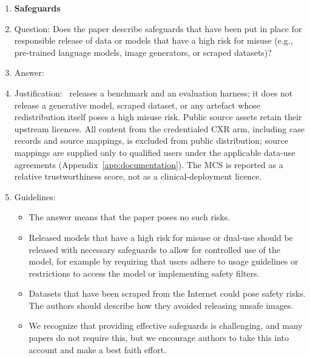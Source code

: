 \begin{enumerate}
\begin{itemize}
        \item If there are negative societal impacts, the authors could also discuss possible mitigation strategies (e.g., gated release of models, providing defenses in addition to attacks, mechanisms for monitoring misuse, mechanisms to monitor how a system learns from feedback over time, improving the efficiency and accessibility of ML).
    \end{itemize}

\item {\bf Safeguards}
    \item[] Question: Does the paper describe safeguards that have been put in place for responsible release of data or models that have a high risk for misuse (e.g., pre-trained language models, image generators, or scraped datasets)?
    \item[] Answer: \answerNA{}
    \item[] Justification: \medvigil\ releases a benchmark and an evaluation harness; it does not release a generative model, scraped dataset, or any artefact whose redistribution itself poses a high misuse risk. Public source assets retain their upstream licences. All content from the credentialed CXR arm, including case records and source mappings, is excluded from public distribution; source mappings are supplied only to qualified users under the applicable data-use agreements (Appendix~\ref{app:documentation}). The MCS is reported as a relative trustworthiness score, not as a clinical-deployment licence.
    \item[] Guidelines:
    \begin{itemize}
        \item The answer \answerNA{} means that the paper poses no such risks.
        \item Released models that have a high risk for misuse or dual-use should be released with necessary safeguards to allow for controlled use of the model, for example by requiring that users adhere to usage guidelines or restrictions to access the model or implementing safety filters.
        \item Datasets that have been scraped from the Internet could pose safety risks. The authors should describe how they avoided releasing unsafe images.
        \item We recognize that providing effective safeguards is challenging, and many papers do not require this, but we encourage authors to take this into account and make a best faith effort.
    \end{itemize}


\end{enumerate}
